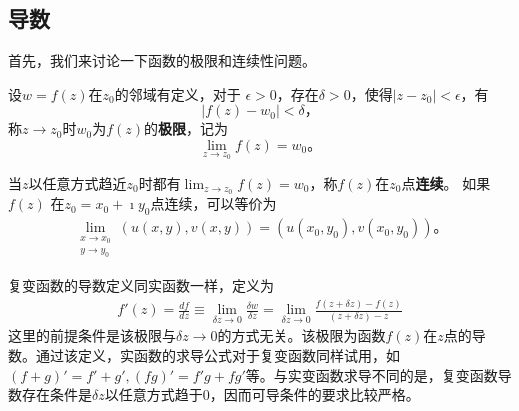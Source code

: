 \subsection{导数}

首先，我们来讨论一下函数的极限和连续性问题。
\begin{Definition}
    设$w=f(z)$在$z_0$的邻域有定义，对于
$\epsilon > 0$，存在$\delta > 0$，使得$|z-z_0| < \epsilon$，有
\begin{equation}
    |f(z) - w_0| < \delta \textrm{，}
\end{equation}
称$z\to z_0$时$w_0$为$f(z)$的{\bf 极限}，记为
\begin{equation}
    \lim_{z\to z_0} f(z) = w_0 \textrm{。}
\end{equation}
\end{Definition}
当$z$以任意方式趋近$z_0$时都有$ \lim_{z\to z_0} f(z) = w_0$，称$f(z)$在$z_0$点{\bf 连续}。
如果$f(z)$ 在$z_0=x_0 + \imath y_0$点连续，可以等价为
\begin{align}
    \lim_{\substack{x\to x_0\\y\to y_0}} \left(u(x,y), v(x,y)\right) = \left(u(x_0, y_0), v(x_0, y_0)\right) \textrm{。} 
\end{align}

复变函数的导数定义同实函数一样，定义为
\begin{align}
    \label{eq:derivative_def}
    f'(z) = \frac{df}{dz} 
    \equiv\lim_{\delta z \to 0} \frac{\delta w} {\delta z} 
    = \lim_{\delta z\to 0} \frac{f(z+\delta z) - f(z) } {(z+\delta z ) - z}
\end{align}
这里的前提条件是该极限与$\delta z \to 0$的方式无关。该极限为函数$f(z)$在$z$点的导数。通过该定义，实函数的求导公式对于复变函数同样试用，如
$(f+g)' = f' + g', (fg)' =f'g + fg'$等。与实变函数求导不同的是，复变函数导数存在条件是$\delta z$以任意方式趋于$0$，因而可导条件的要求比较严格。

